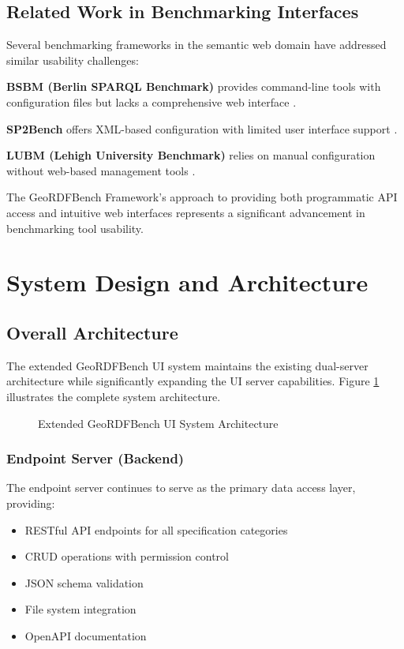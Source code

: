 \documentclass[11pt,a4paper]{article}
\begin{document}
\subsection{Related Work in Benchmarking Interfaces}

Several benchmarking frameworks in the semantic web domain have addressed similar usability challenges:

\textbf{BSBM (Berlin SPARQL Benchmark)} provides command-line tools with configuration files but lacks a comprehensive web interface \cite{bsbm2009}.

\textbf{SP2Bench} offers XML-based configuration with limited user interface support \cite{sp2bench2009}.

\textbf{LUBM (Lehigh University Benchmark)} relies on manual configuration without web-based management tools \cite{lubm2005}.

The GeoRDFBench Framework's approach to providing both programmatic API access and intuitive web interfaces represents a significant advancement in benchmarking tool usability.

\section{System Design and Architecture}

\subsection{Overall Architecture}

The extended GeoRDFBench UI system maintains the existing dual-server architecture while significantly expanding the UI server capabilities. Figure \ref{fig:architecture} illustrates the complete system architecture.

\begin{figure}[H]
    \centering
    \begin{tikzpicture}[node distance=2cm, auto]
    \end{tikzpicture}
    \caption{Extended GeoRDFBench UI System Architecture}
    \label{fig:architecture}
\end{figure}

\subsubsection{Endpoint Server (Backend)}
The endpoint server continues to serve as the primary data access layer, providing:
\begin{itemize}
    \item RESTful API endpoints for all specification categories
    \item CRUD operations with permission control
    \item JSON schema validation
    \item File system integration
    \item OpenAPI documentation
\end{itemize}
\end{document}
